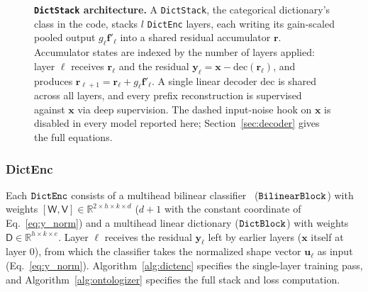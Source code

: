 %
%
%
%

\begin{figure}[tp]
\centering
\resizebox{\linewidth}{!}{}
\caption[\texttt{DictStack} architecture]{\textbf{\texttt{DictStack} architecture.}
	A \texttt{DictStack}, the categorical dictionary's class in the code,
	stacks $l$ \texttt{DictEnc} layers, each writing
	its gain-scaled pooled output $g_\ell\mathbf{f}'_\ell$ into a shared
	residual accumulator $\mathbf{r}$. Accumulator states are indexed by the
	number of layers applied: layer $\ell$ receives $\mathbf{r}_\ell$ and the
	residual $\mathbf{y}_\ell = \mathbf{x} - \mathrm{dec}(\mathbf{r}_\ell)$,
	and produces $\mathbf{r}_{\ell+1} = \mathbf{r}_\ell + g_\ell\mathbf{f}'_\ell$.
	A single linear decoder $\mathrm{dec}$ is shared across all layers, and
	every prefix reconstruction is supervised against $\mathbf{x}$ via deep
	supervision. The dashed input-noise hook on $\mathbf{x}$ is disabled in
	every model reported here; Section~\ref{sec:decoder} gives the full
	equations.}
\label{fig:onto-stack}
\end{figure}

\subsubsection{DictEnc}
\label{sec:dictenc}
Each $\mathop{\mathtt{DictEnc}}\limits$ consists of a multihead bilinear
classifier~\cite{pirsiavash2009,kim2017} ($\mathop{\mathtt{BilinearBlock}}\limits$) with weights
$[\mathsf{W}, \mathsf{V}] \in \mathbb{R}^{2 \times h \times k \times d}$
($d+1$ with the constant coordinate of Eq.~\eqref{eq:y_norm})
and a multihead linear dictionary ($\mathop{\mathtt{DictBlock}}\limits$)
with weights $\mathsf{D} \in \mathbb{R}^{h \times k \times e}$.
Layer $\ell$ receives the residual $\mathbf{y}_\ell$ left by earlier
layers ($\mathbf{x}$ itself at layer 0), from which the classifier takes
the normalized shape vector $\mathbf{u}_\ell$ as input
(Eq.~\eqref{eq:y_norm}). Algorithm~\ref{alg:dictenc} specifies the
single-layer training pass, and Algorithm~\ref{alg:ontologizer} specifies
the full stack and loss computation.

